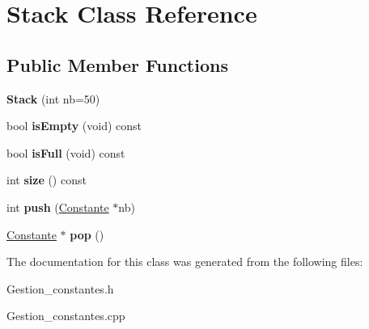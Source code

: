 \hypertarget{class_stack}{\section{Stack Class Reference}
\label{class_stack}
}
\subsection*{Public Member Functions}
\begin{DoxyCompactItemize}
\item 
\hypertarget{class_stack_a8cf5d6fd8d89b6edbf64da16e3206a56}{{\bfseries Stack} (int nb=50)}\label{class_stack_a8cf5d6fd8d89b6edbf64da16e3206a56}

\item 
\hypertarget{class_stack_a51464b7aa2a497ebc751862120debbda}{bool {\bfseries is\-Empty} (void) const }\label{class_stack_a51464b7aa2a497ebc751862120debbda}

\item 
\hypertarget{class_stack_a83e4a6131725241f7919ea27b8ab812b}{bool {\bfseries is\-Full} (void) const }\label{class_stack_a83e4a6131725241f7919ea27b8ab812b}

\item 
\hypertarget{class_stack_ae53b3e26c5288bb1974693b1b2767a69}{int {\bfseries size} () const }\label{class_stack_ae53b3e26c5288bb1974693b1b2767a69}

\item 
\hypertarget{class_stack_a7248e17bcd1ffd2d0e7244fdcffc8f16}{int {\bfseries push} (\hyperlink{class_calcul_1_1_constante}{Constante} $\ast$nb)}\label{class_stack_a7248e17bcd1ffd2d0e7244fdcffc8f16}

\item 
\hypertarget{class_stack_ae3da45c6867f3bbafa276df693770b25}{\hyperlink{class_calcul_1_1_constante}{Constante} $\ast$ {\bfseries pop} ()}\label{class_stack_ae3da45c6867f3bbafa276df693770b25}

\end{DoxyCompactItemize}


The documentation for this class was generated from the following files\-:\begin{DoxyCompactItemize}
\item 
Gestion\-\_\-constantes.\-h\item 
Gestion\-\_\-constantes.\-cpp\end{DoxyCompactItemize}
